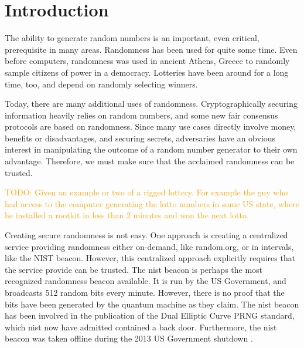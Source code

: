 \section{Introduction}\label{cha:introduction}

The ability to generate random numbers is an important, even critical, prerequisite in many areas. Randomness has been used for quite some time.
Even before computers, randomness was used in ancient Athens, Greece to randomly sample citizens of power in a democracy.
Lotteries have been around for a long time, too, and depend on randomly selecting winners.

Today, there are many additional uses of randomness.
Cryptographically securing information heavily relies on random numbers, and some new fair consensus protocols are based on randomness.
Since many use cases directly involve money, benefits or disadvantages, and securing secrets, adversaries have an obvious interest in manipulating the outcome of a random number generator to their own advantage.
Therefore, we must make sure that the acclaimed randomness can be trusted.

\textcolor{orange}{TODO: Given an example or two of a rigged lottery. For example the guy who had access to the computer generating the lotto numbers in some US state, where he installed a rootkit in less than 2 minutes and won the next lotto.}

Creating secure randomness is not easy.
One approach is creating a centralized service providing randomness either on-demand, like random.org, or in intervals, like the NIST beacon.
However, this centralized approach explicitly requires that the service provide can be trusted.
The \gls{nist} beacon is perhaps the most recognized randomness beacon available.
It is run by the US Government, and broadcasts 512 random bits every minute.
However, there is no proof that the bits have been generated by the quantum machine as they claim.
The \gls{nist} beacon has been involved in the publication of the Dual Elliptic Curve PRNG standard, which \gls{nist} now have admitted contained a back door.
Furthermore, the \gls{nist} beacon was taken offline during the 2013 US Government shutdown .

